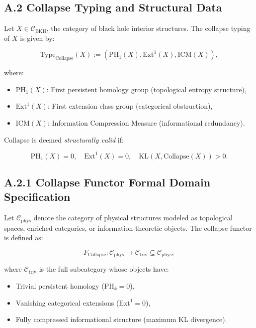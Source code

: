 \documentclass[11pt]{article}
\begin{document}
\subsection*{A.2 Collapse Typing and Structural Data}

Let \( X \in \mathcal{C}_{\mathrm{BKH}} \), the category of black hole interior structures. The collapse typing of \( X \) is given by:

\[
\mathrm{Type}_{\mathrm{Collapse}}(X) := \left( \mathrm{PH}_1(X), \mathrm{Ext}^1(X), \mathrm{ICM}(X) \right),
\]

where:

\begin{itemize}
    \item \( \mathrm{PH}_1(X) \): First persistent homology group (topological entropy structure),
    \item \( \mathrm{Ext}^1(X) \): First extension class group (categorical obstruction),
    \item \( \mathrm{ICM}(X) \): Information Compression Measure (informational redundancy).
\end{itemize}

Collapse is deemed \emph{structurally valid} if:

\[
\mathrm{PH}_1(X) = 0,\quad \mathrm{Ext}^1(X) = 0,\quad \mathrm{KL}(X, \mathrm{Collapse}(X)) > 0.
\]

\subsection*{A.2.1 Collapse Functor Formal Domain Specification}

Let \( \mathcal{C}_{\mathrm{phys}} \) denote the category of physical structures modeled as topological spaces, enriched categories, or information-theoretic objects. The collapse functor is defined as:

\[
F_{\mathrm{Collapse}} : \mathcal{C}_{\mathrm{phys}} \longrightarrow \mathcal{C}_{\mathrm{triv}} \subseteq \mathcal{C}_{\mathrm{phys}},
\]

where \( \mathcal{C}_{\mathrm{triv}} \) is the full subcategory whose objects have:

\begin{itemize}
    \item Trivial persistent homology (\( \mathrm{PH}_k = 0 \)),
    \item Vanishing categorical extensions (\( \mathrm{Ext}^1 = 0 \)),
    \item Fully compressed informational structure (maximum KL divergence).
\end{itemize}
\end{document}

